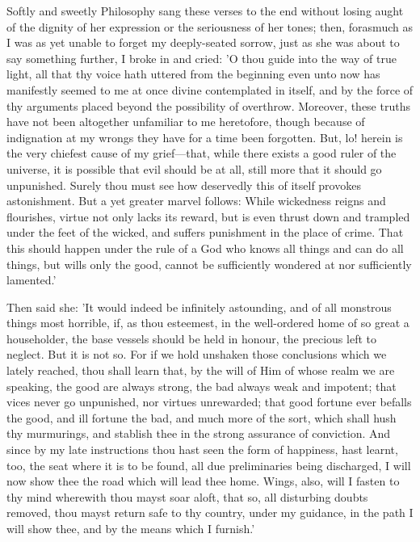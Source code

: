Softly and sweetly Philosophy sang these verses to the end without
losing aught of the dignity of her expression or the seriousness of her
tones; then, forasmuch as I was as yet unable to forget my deeply-seated
sorrow, just as she was about to say something further, I broke in and
cried: 'O thou guide into the way of true light, all that thy voice hath
uttered from the beginning even unto now has manifestly seemed to me at
once divine contemplated in itself, and by the force of thy arguments
placed beyond the possibility of overthrow. Moreover, these truths have
not been altogether unfamiliar to me heretofore, though because of
indignation at my wrongs they have for a time been forgotten. But, lo!
herein is the very chiefest cause of my grief—that, while there exists
a good ruler of the universe, it is possible that evil should be at all,
still more that it should go unpunished. Surely thou must see how
deservedly this of itself provokes astonishment. But a yet greater
marvel follows: While wickedness reigns and flourishes, virtue not only
lacks its reward, but is even thrust down and trampled under the feet of
the wicked, and suffers punishment in the place of crime. That this
should happen under the rule of a God who knows all things and can do
all things, but wills only the good, cannot be sufficiently wondered at
nor sufficiently lamented.'

Then said she: 'It would indeed be infinitely astounding, and of all
monstrous things most horrible, if, as thou esteemest, in the
well-ordered home of so great a householder, the base vessels should be
held in honour, the precious left to neglect. But it is not so. For if
we hold unshaken those conclusions which we lately reached, thou shall
learn that, by the will of Him of whose realm we are speaking, the good
are always strong, the bad always weak and impotent; that vices never go
unpunished, nor virtues unrewarded; that good fortune ever befalls the
good, and ill fortune the bad, and much more of the sort, which shall
hush thy murmurings, and stablish thee in the strong assurance of
conviction. And since by my late instructions thou hast seen the form of
happiness, hast learnt, too, the seat where it is to be found, all due
preliminaries being discharged, I will now show thee the road which will
lead thee home. Wings, also, will I fasten to thy mind wherewith thou
mayst soar aloft, that so, all disturbing doubts removed, thou mayst
return safe to thy country, under my guidance, in the path I will show
thee, and by the means which I furnish.'

